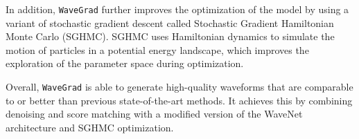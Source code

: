 In addition, \texttt{WaveGrad} further improves the optimization of the model by using a variant of stochastic gradient descent called Stochastic Gradient Hamiltonian Monte Carlo (SGHMC). 
SGHMC uses Hamiltonian dynamics to simulate the motion of particles in a potential energy landscape, which improves the exploration of the parameter space during optimization.

Overall, \texttt{WaveGrad} is able to generate high-quality waveforms that are comparable to or better than previous state-of-the-art methods. 
It achieves this by combining denoising and score matching with a modified version of the WaveNet architecture and SGHMC optimization. 

